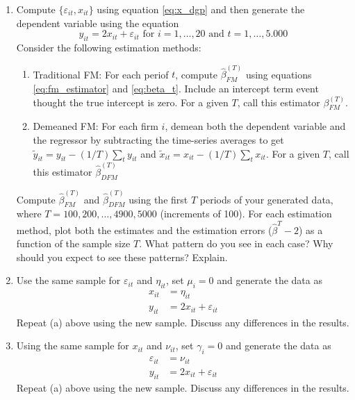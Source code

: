 \begin{enumerate}[label = (\alph*)]
\item  Compute \(\lbrace \varepsilon_{it}, x_{it}\rbrace\) using equation \ref{eq:x_dgp} and then generate the dependent variable using the equation
\[
    y_{it} = 2x_{it} + \varepsilon_{it} \text{ for } i = 1, \dots, 20 \text{ and } t = 1, \dots, 5.000
\]
Consider the following estimation methods:
\begin{enumerate}[label = \arabic*.]
    \item Traditional FM: For each periof \(t\), compute \(\widehat\beta^{(T)}_{FM}\) using equations \ref{eq:fm_estimator} and \ref{eq:beta_t}. Include an intercept term event thought the true intercept is zero. For a given \(T\), call this estimator \(\beta^{(T)}_{FM}\).
    \item Demeaned FM: For each firm \(i\), demean both the dependent variable and the regressor by subtracting the time-series averages to get \(\tilde y_{it} = y_{it} - \left(1/T\right)\sum_t y_{it}\) and \(\tilde x_{it} = x_{it} - \left(1/T\right)\sum_t x_{it}\). For a given \(T\), call this estimator \(\widehat \beta^{(T)}_{DFM}\)
\end{enumerate}
Compute \(\widehat\beta^{(T)}_{FM}\) and \(\widehat\beta^{(T)}_{DFM}\) using the first \(T\) periods of your generated data, where \(T = 100, 200, \dots, 4900, 5000\) (increments of 100). For each estimation method, plot both the estimates and the estimation errors (\(\widehat\beta^T-2\)) as a function of the sample size \(T\). What pattern do you see in each case? Why should you expect to see these patterns? Explain.

\item Use the same sample for \(\varepsilon_{it}\) and \(\eta_{it}\), set \(\mu_i = 0\) and generate the data as
\begin{align*}
    x_{it} & = \eta_{it} \\
    y_{it} & = 2x_{it} + \varepsilon_{it}
\end{align*}
Repeat (a) above using the new sample. Discuss any differences in the results.

\item Using the same sample for \(x_{it}\) and \(\nu_{it}\), set \(\gamma_i = 0\) and generate the data as
\begin{align*}
    \varepsilon_{it} & = \nu_{it} \\
    y_{it} & = 2x_{it} + \varepsilon_{it}
\end{align*}
Repeat (a) above using the new sample. Discuss any differences in the results.


\end{enumerate}

